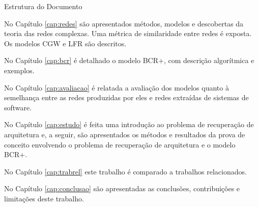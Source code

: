 \begin{section}{Estrutura do Documento}
	
	No Capítulo \ref{cap:redes} são apresentados métodos, modelos e descobertas da teoria das redes complexas. Uma métrica de similaridade entre redes é exposta. Os modelos CGW e LFR são descritos.
	
	No Capítulo \ref{cap:bcr} é detalhado o modelo BCR+, com descrição algorítmica e exemplos.
	
	No Capítulo \ref{cap:avaliacao} é relatada a avaliação dos modelos quanto à semelhança entre as redes produzidas por eles e redes extraídas de sistemas de software.
	
	No Capítulo \ref{cap:estudo} é feita uma introdução ao problema de recuperação de arquitetura e, a seguir, são apresentados os métodos e resultados da prova de conceito envolvendo o problema de recuperação de arquitetura e o modelo BCR+.
	
	No Capítulo \ref{cap:trabrel} este trabalho é comparado a trabalhos relacionados. 
	
	No Capítulo \ref{cap:conclusao} são apresentadas as conclusões, contribuições e limitações deste trabalho.
	
\end{section}
